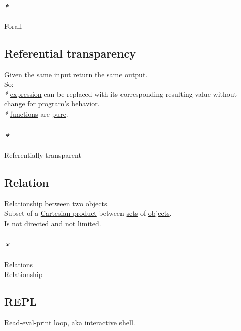 \documentclass[11pt]{article}
\begin{document}
\paragraph{\emph{*}}
\label{sec:orgf0cc1c1}

\label{org746fdae}Forall\\

\subsection{\label{org5564cd1}Referential transparency}
\label{sec:orgaa55bea}
Given the same input return the same output.\\
So:\\
\emph{*} \hyperref[org667db83]{expression} can be replaced with its corresponding resulting value without change for program's behavior.\\
\emph{*} \hyperref[org66c5288]{functions} are \hyperref[org08c21de]{pure}.\\

\subsubsection{\emph{*}}
\label{sec:orgbb7f77c}

\label{org5256c2f}Referentially transparent\\

\subsection{\label{org6e8ae46}Relation}
\label{sec:org92a273e}
\hyperref[orged9f8c3]{Relationship} between two \hyperref[orge0f000f]{objects}.\\
Subset of a \hyperref[org434cb99]{Cartesian product} between \hyperref[org4e7443a]{sets} of \hyperref[orge0f000f]{objects}.\\
Is not directed and not limited.\\

\subsubsection{\emph{*}}
\label{sec:orgdc0f9e3}

\label{org5e14e7d}Relations\\
\label{orged9f8c3}Relationship\\

\subsection{\label{orgca0a6fe}REPL}
\label{sec:org9d14444}
Read-eval-print loop, aka interactive shell.\\
\end{document}
